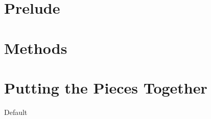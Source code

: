 \documentclass[12pt,chapterprefix]{scrbook}
\begin{document}
\cleardoubleoddpage
\tableofcontents
\listoffigures
\listoftables
\listoftheorems[ignoreall,show={definition}]
\cleardoubleoddpage
{}

\part{Prelude}








%

\part{Methods}










%



















\part{Putting the Pieces Together}





{Default}


\cleardoubleoddpage
\printglossaries
\end{document}
